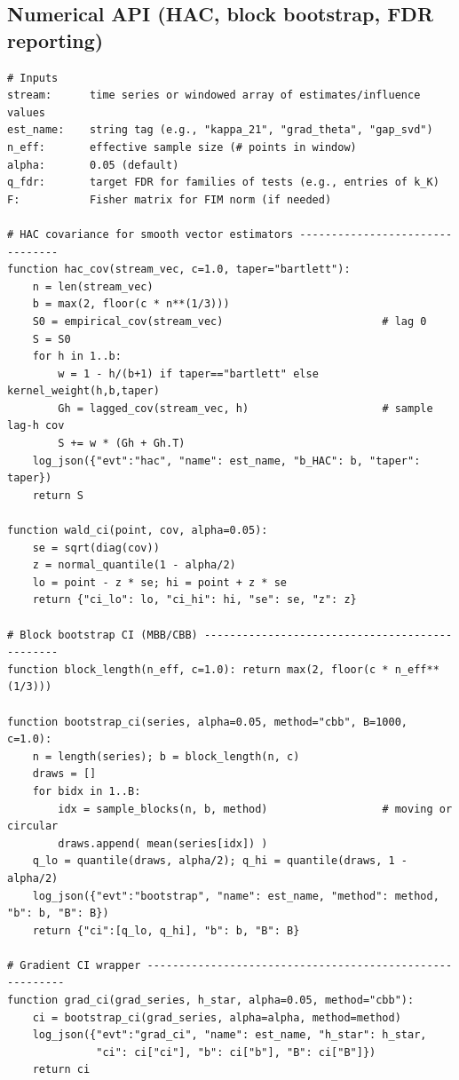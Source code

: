 \subsection*{Numerical API (HAC, block bootstrap, FDR reporting)}

\begin{lstlisting}
# Inputs
stream:      time series or windowed array of estimates/influence values
est_name:    string tag (e.g., "kappa_21", "grad_theta", "gap_svd")
n_eff:       effective sample size (# points in window)
alpha:       0.05 (default)
q_fdr:       target FDR for families of tests (e.g., entries of k_K)
F:           Fisher matrix for FIM norm (if needed)

# HAC covariance for smooth vector estimators --------------------------------
function hac_cov(stream_vec, c=1.0, taper="bartlett"):
    n = len(stream_vec)
    b = max(2, floor(c * n**(1/3)))
    S0 = empirical_cov(stream_vec)                         # lag 0
    S = S0
    for h in 1..b:
        w = 1 - h/(b+1) if taper=="bartlett" else kernel_weight(h,b,taper)
        Gh = lagged_cov(stream_vec, h)                     # sample lag-h cov
        S += w * (Gh + Gh.T)
    log_json({"evt":"hac", "name": est_name, "b_HAC": b, "taper": taper})
    return S

function wald_ci(point, cov, alpha=0.05):
    se = sqrt(diag(cov))
    z = normal_quantile(1 - alpha/2)
    lo = point - z * se; hi = point + z * se
    return {"ci_lo": lo, "ci_hi": hi, "se": se, "z": z}

# Block bootstrap CI (MBB/CBB) -----------------------------------------------
function block_length(n_eff, c=1.0): return max(2, floor(c * n_eff**(1/3)))

function bootstrap_ci(series, alpha=0.05, method="cbb", B=1000, c=1.0):
    n = length(series); b = block_length(n, c)
    draws = []
    for bidx in 1..B:
        idx = sample_blocks(n, b, method)                  # moving or circular
        draws.append( mean(series[idx]) )
    q_lo = quantile(draws, alpha/2); q_hi = quantile(draws, 1 - alpha/2)
    log_json({"evt":"bootstrap", "name": est_name, "method": method, "b": b, "B": B})
    return {"ci":[q_lo, q_hi], "b": b, "B": B}

# Gradient CI wrapper ---------------------------------------------------------
function grad_ci(grad_series, h_star, alpha=0.05, method="cbb"):
    ci = bootstrap_ci(grad_series, alpha=alpha, method=method)
    log_json({"evt":"grad_ci", "name": est_name, "h_star": h_star,
              "ci": ci["ci"], "b": ci["b"], "B": ci["B"]})
    return ci


\end{lstlisting}
